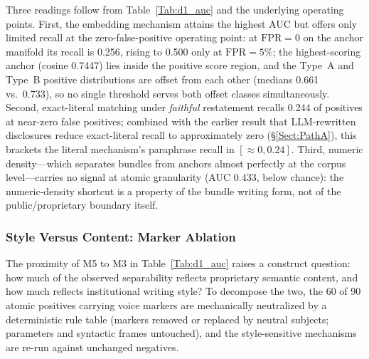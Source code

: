 \documentclass[journal]{IEEEtran}
\begin{document}
Three readings follow from Table~\ref{Tab:d1_auc} and the underlying
operating points. First, the embedding mechanism attains the highest AUC but
offers only limited recall at the zero-false-positive operating point: at $\mathrm{FPR}=0$ on
the anchor manifold its recall is 0.256, rising to 0.500 only at
$\mathrm{FPR}=5\%$; the highest-scoring anchor (cosine 0.7447) lies inside
the positive score region, and the Type~A and Type~B positive distributions
are offset from each other (medians 0.661 vs.\ 0.733), so no single threshold
serves both offset classes simultaneously. Second, exact-literal matching
under \emph{faithful} restatement recalls 0.244 of positives at near-zero
false positives; combined with the earlier result that LLM-rewritten
disclosures reduce exact-literal recall to approximately zero
(\S\ref{Sect:PathA}), this brackets the literal mechanism's paraphrase recall
in $[\approx 0, 0.24]$. Third, numeric density---which separates bundles from
anchors almost perfectly at the corpus level---carries no signal at atomic
granularity (AUC 0.433, below chance): the numeric-density shortcut is a
property of the bundle writing form, not of the public/proprietary boundary
itself.

\subsubsection{Style Versus Content: Marker Ablation}
\label{Sect:V_E_2_D11}

The proximity of M5 to M3 in Table~\ref{Tab:d1_auc} raises a construct
question: how much of the observed separability reflects proprietary semantic
content, and how much reflects institutional writing style? To decompose the
two, the 60 of 90 atomic positives carrying voice markers are mechanically
neutralized by a deterministic rule table (markers removed or replaced by
neutral subjects; parameters and syntactic frames untouched), and the
style-sensitive mechanisms are re-run against unchanged negatives.

\begin{table}[!t]
    \centering
    \caption{Marker-style ablation: AUC before and after neutralizing institutional-voice markers in the positives.}
    \label{Tab:d11_ablation}
\end{table}
\end{document}
